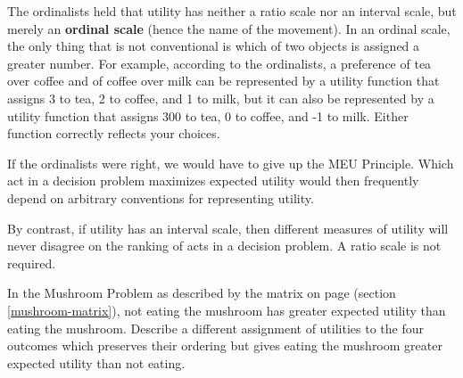 The ordinalists held that utility has neither a ratio scale nor an
interval scale, but merely an \textbf{ordinal scale} (hence the name
of the movement). In an ordinal scale, the only thing that is not
conventional is which of two objects is assigned a greater number. For
example, according to the ordinalists, a preference of tea over coffee
and of coffee over milk can be represented by a utility function that
assigns 3 to tea, 2 to coffee, and 1 to milk, but it can also be
represented by a utility function that assigns 300 to tea, 0 to
coffee, and -1 to milk. Either function correctly reflects your
choices.

If the ordinalists were right, we would have to give up the MEU
Principle. Which act in a decision problem maximizes expected utility
would then frequently depend on arbitrary conventions for representing
utility.

By contrast, if utility has an interval scale, then different measures
of utility will never disagree on the ranking of acts in a decision
problem. A ratio scale is not required. 

\begin{exercise1}
  In the Mushroom Problem as described by the matrix on page
  \pageref{mushroom-matrix} (section \ref{mushroom-matrix}), not
  eating the mushroom has greater expected utility than eating the
  mushroom. Describe a different assignment of utilities to the four
  outcomes which preserves their ordering but gives eating the mushroom
  greater expected utility than not eating.
\end{exercise1}



